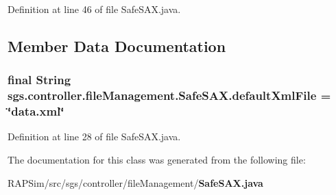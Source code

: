 Definition at line 46 of file Safe\-S\-A\-X.\-java.



\subsection{Member Data Documentation}
\subsubsection[{default\-Xml\-File}]{\setlength{\rightskip}{0pt plus 5cm}final String sgs.\-controller.\-file\-Management.\-Safe\-S\-A\-X.\-default\-Xml\-File = \char`\"{}data.\-xml\char`\"{}\hspace{0.3cm}{\ttfamily [static]}}\label{classsgs_1_1controller_1_1file_management_1_1_safe_s_a_x_a823c3a0d603f7065a88d91587a069aaa}


Definition at line 28 of file Safe\-S\-A\-X.\-java.



The documentation for this class was generated from the following file\-:\begin{DoxyCompactItemize}
\item 
R\-A\-P\-Sim/src/sgs/controller/file\-Management/{\bf Safe\-S\-A\-X.\-java}\end{DoxyCompactItemize}
